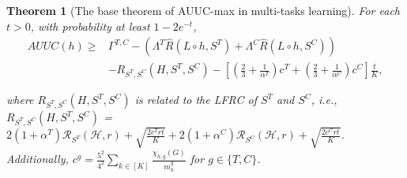\documentclass{article}
\newtheorem{theorem}{Theorem}
\begin{document}
\begin{theorem}[The base theorem of AUUC-max in multi-tasks learning] \label{thm:multi own2 2.1 base} For each $t > 0$, with probability at least $1-2e^{-t}$,
\begin{align*}
    AUUC (h) \geq &  \Gamma^{T,C} - ( \Lambda^T \hat{R}(L \circ h, S^T) + \Lambda^C \hat{R}(L \circ h, S^C) )  \\ & -  R_{S^T,S^C} (H,S^T,S^C) - [(\frac{2}{3} + \frac{1}{\alpha^T} ) c^T + (\frac{2}{3} + \frac{1}{\alpha^C} )c^C] \frac{t}{K} ,
\end{align*}

where $R_{S^T,S^C} (H,S^T,S^C)$ is related to the LFRC of $S^T$ and $S^C$, i.e., $R_{S^T,S^C} (H,S^T,S^C)$ = $2(1+\alpha^T) \mathcal{R}_{S^T}(\mathcal{H},r) + \sqrt{\frac{2c^T rt}{K}} + 2(1+\alpha^C) \mathcal{R}_{S^C}(\mathcal{H},r) + \sqrt{\frac{2c^C rt}{K}}$. Additionally, $c^g = \frac{5^2}{4^2} 
\sum_{k \in [K]} \frac{\chi_{h,g}(G)}{m_k^g} $ for $g \in \{ T,C \}$.    
\end{theorem}



\end{document}
